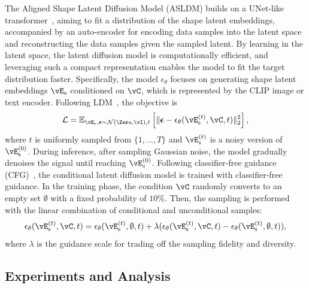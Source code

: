 \documentclass[../../book-main.tex]{subfiles}
\begin{document}
The Aligned Shape Latent Diffusion Model (ASLDM) builds on a
UNet-like transformer~\cite{10203178}, aiming to fit a distribution
of the shape latent embeddings, accompanied by an auto-encoder for
encoding data samples into the latent space and reconstructing the
data samples given the sampled latent. By learning in the latent
space, the latent diffusion model is computationally efficient, and
leveraging such a compact representation enables the model to fit the
target distribution faster. Specifically, the model
$\epsilon_{\theta}$ focuses on generating shape latent embeddings
$\vE_{\mathrm{s}}$ conditioned on $\vC$, which is represented by the
CLIP image or text encoder. Following LDM~\cite{rombach2022high}, the
objective is
\begin{equation}
\mathcal{L} = \mathbb{E}_{\vE_{\mathrm{s}}, \boldsymbol{\epsilon} \sim
\mathcal{N}(\Zero,\vI),t} \left[ \Vert \boldsymbol{\epsilon}
- \epsilon_\theta(\vE_{\mathrm{s}}^{(t)}, \vC, t) \Vert^2_2 \right],
\end{equation}
where $t$ is uniformly sampled from $\{1, ..., T\}$ and
$\vE_{\mathrm{s}}^{(t)}$ is a noisy version of
$\vE_{\mathrm{s}}^{(0)}$. During inference, after sampling Gaussian
noise, the model gradually denoises the signal until reaching
$\vE_{\mathrm{s}}^{(0)}$. Following classifier-free guidance
(CFG)~\cite{ho2021classifierfree}, the conditional latent diffusion
model is trained with classifier-free guidance. In the training
phase, the condition $\vC$ randomly converts to an empty set
$\emptyset$ with a fixed probability of $10\%$. Then, the sampling is
performed with the linear combination of conditional and unconditional samples:
\begin{equation}
\epsilon_\theta ( \vE_{\mathrm{s}}^{(t)}, \vC, t ) = \epsilon_\theta(
\vE_{\mathrm{s}}^{(t)}, \emptyset, t ) + \lambda
( \epsilon_\theta( \vE_{\mathrm{s}}^{(t)}, \vC, t ) -\epsilon_\theta(
\vE_{\mathrm{s}}^{(t)}, \emptyset, t ) ),
\label{eq:cfg-michelangelo}
\end{equation}
where $\lambda$ is the guidance scale for trading off the sampling
fidelity and diversity.

\subsection{Experiments and Analysis}
\end{document}
